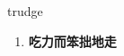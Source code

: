 
\begin{frame}
{\huge trudge}
\begin{center}
\begin{enumerate}\Large
  \item \textbf{吃力而笨拙地走}
\end{enumerate}
\end{center}
\end{frame}
